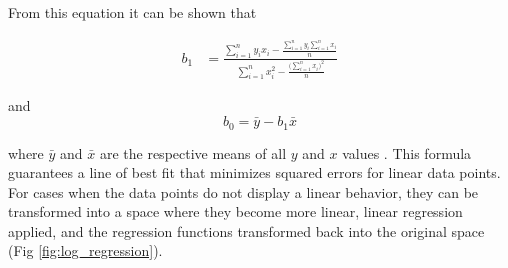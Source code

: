 From this equation it can be shown that 

\begin{align}
b_1 &= \frac{\sum_{i=1}^n y_ix_i - \frac{\sum_{i=1}^n y_i \sum_{i=1}^n x_i}{n}}{\sum_{i=1}^n x_i^2 - \frac{\Big(\sum_{i=1}^n x_i \Big)^2}{n}}
\end{align}

and 
$$ b_0 = \bar y - b_1 \bar x $$

where $\bar y$ and $\bar x$ are the respective means of all $y$ and $x$ values \cite{Finney1996}. This formula guarantees a line of best fit that minimizes squared errors for linear data points. For cases when the data points do not display a linear behavior, they can be transformed into a space where they become more linear, linear regression applied, and the regression functions transformed back into the original space (Fig \ref{fig:log_regression}).

